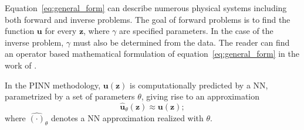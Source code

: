 \documentclass[pdflatex,sn-basic]{sn-jnl}%
\theoremstyle{thmstyleone}%
\theoremstyle{thmstyletwo}%
\theoremstyle{thmstylethree}%
\begin{document}
Equation~\eqref{eq:general_form} 
can describe numerous physical systems including 
both forward and inverse problems.
The goal of forward problems is to find the function $\bm{u}$ for every $\bm{z}$, where $\gamma$ are specified parameters.
In the case of the inverse problem, $\gamma$ must also be determined from the data.
%
The reader can find an operator based mathematical formulation
of equation~\eqref{eq:general_form}
in the work of  \cite{Mis2021_EstimatesGeneralizationError_MolMM}.


In the PINN methodology, $\bm{u}(\bm{z})$ is computationally predicted by a NN, parametrized  by a set of parameters $\theta$, giving rise to an approximation $$\hat{\bm{u}}_\theta(\bm{z}) \approx \bm{u}(\bm{z});$$
where $\hat{(\cdot)}_\theta$ denotes a NN approximation realized with $\theta$.
\end{document}
